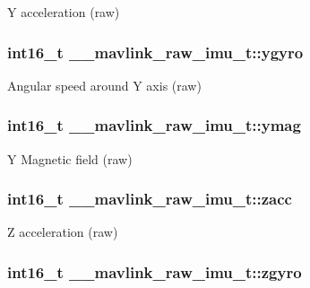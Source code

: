 Y acceleration (raw) 

\hypertarget{struct____mavlink__raw__imu__t_aff358c8fc1fb40d5862c7367d4bf80e9}{
\subsubsection[{ygyro}]{\setlength{\rightskip}{0pt plus 5cm}int16\+\_\+t \+\_\+\+\_\+mavlink\+\_\+raw\+\_\+imu\+\_\+t\+::ygyro}}\label{struct____mavlink__raw__imu__t_aff358c8fc1fb40d5862c7367d4bf80e9}


Angular speed around Y axis (raw) 

\hypertarget{struct____mavlink__raw__imu__t_a813c4472362512205eb1035d67f80ff2}{
\subsubsection[{ymag}]{\setlength{\rightskip}{0pt plus 5cm}int16\+\_\+t \+\_\+\+\_\+mavlink\+\_\+raw\+\_\+imu\+\_\+t\+::ymag}}\label{struct____mavlink__raw__imu__t_a813c4472362512205eb1035d67f80ff2}


Y Magnetic field (raw) 

\hypertarget{struct____mavlink__raw__imu__t_a0c71dfe587d17f471e59ed5acd5691f8}{
\subsubsection[{zacc}]{\setlength{\rightskip}{0pt plus 5cm}int16\+\_\+t \+\_\+\+\_\+mavlink\+\_\+raw\+\_\+imu\+\_\+t\+::zacc}}\label{struct____mavlink__raw__imu__t_a0c71dfe587d17f471e59ed5acd5691f8}


Z acceleration (raw) 

\hypertarget{struct____mavlink__raw__imu__t_a42af4ae862faf80bb6754e09db7ca9fe}{
\subsubsection[{zgyro}]{\setlength{\rightskip}{0pt plus 5cm}int16\+\_\+t \+\_\+\+\_\+mavlink\+\_\+raw\+\_\+imu\+\_\+t\+::zgyro}}\label{struct____mavlink__raw__imu__t_a42af4ae862faf80bb6754e09db7ca9fe}



